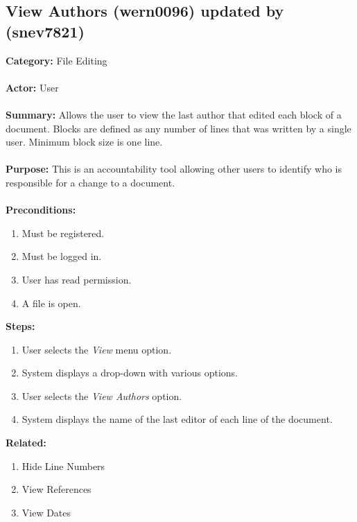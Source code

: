 \documentclass[11pt]{report}
\begin{document}
\subsection{View Authors (wern0096) updated by (snev7821)}
\begin{framed}

	\textbf{Category:} File Editing \\ \\
	\textbf{Actor:} User \\ \\
	\textbf{Summary:} Allows the user to view the last author that edited each block of a document. Blocks are defined as any number of lines that was written by a single user. Minimum block size is one line. \\ \\
	\textbf{Purpose:} This is an accountability tool allowing other users to identify who is responsible for a change to a document. \\ \\
	\textbf{Preconditions:} 
	\begin{enumerate}
		\item Must be registered.
		\item Must be logged in.
		\item User has read permission.
		\item A file is open.
	\end{enumerate}
	\textbf{Steps:}
	\begin{enumerate}
		\item User selects the \textit{View} menu option.
		\item System displays a drop-down with various options.
		\item User selects the \textit{View Authors} option.
		\item System displays the name of the last editor of each line of the document.
	\end{enumerate}
	\textbf{Related:}
	\begin{enumerate}
		\item Hide Line Numbers
		\item View References
		\item View Dates
	\end{enumerate}
\end{framed}





\newpage
\end{document}
